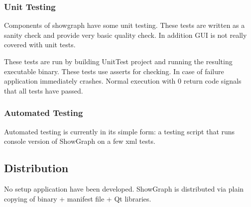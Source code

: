 \documentclass[11pt,twoside,a4paper]{article}
\begin{document}
\subsubsection{Unit Testing}
Components of showgraph have some unit testing. These tests are written as a sanity check and provide very basic quality check. In addition GUI is not really covered with unit tests.

These tests are run by building UnitTest project and running the resulting executable binary. These tests use asserts for checking. In case of failure application immediately crashes. Normal execution with 0 return code signals that all tests have passed.

\subsubsection{Automated Testing}
Automated testing is currently in its simple form: a testing script that runs console version of ShowGraph on a few xml tests.

\subsection{Distribution}
No setup application have been developed. ShowGraph is distributed via plain copying of binary + manifest file + Qt libraries.
\end{document}
